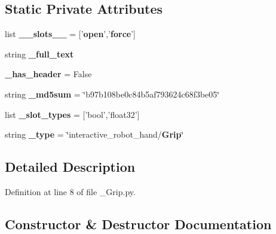 \subsection*{Static Private Attributes}
\begin{DoxyCompactItemize}
\item 
list {\bf \-\_\-\-\_\-slots\-\_\-\-\_\-} = ['{\bf open}','{\bf force}']
\item 
string {\bf \-\_\-full\-\_\-text}
\item 
{\bf \-\_\-has\-\_\-header} = False
\item 
string {\bf \-\_\-md5sum} = \char`\"{}b97b108be0c84b5af793624c68f3be05\char`\"{}
\item 
list {\bf \-\_\-slot\-\_\-types} = ['bool','float32']
\item 
string {\bf \-\_\-type} = \char`\"{}interactive\-\_\-robot\-\_\-hand/{\bf Grip}\char`\"{}
\end{DoxyCompactItemize}


\subsection{Detailed Description}


Definition at line 8 of file \-\_\-\-Grip.\-py.



\subsection{Constructor \& Destructor Documentation}
